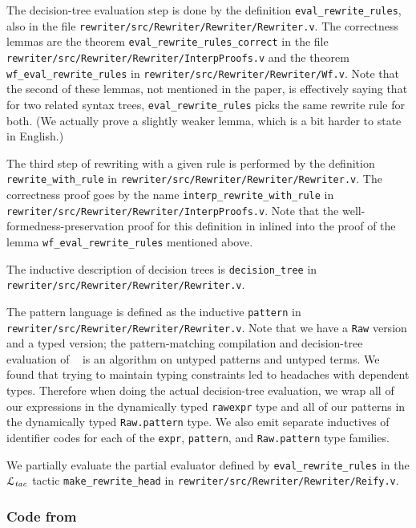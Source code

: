 \documentclass[a4paper,USenglish,cleveref,autoref,thm-restate]{lipics-v2021}
\newcommand{\citet}[1]{\usebibentry{#1}{citet}~\cite{#1}}
\newcommand{\Ltac}{\ensuremath{\mathcal{L}_\text{\emph{tac}}}}
\begin{document}
\begin{minipage}[t][1cm]{\textwidth}
The decision-tree evaluation step is done by the definition \texttt{eval\_rewrite\_rules}, also in the file \texttt{rewriter/src/Rewriter/Rewriter/Rewriter.v}.
The correctness lemmas are the theorem \texttt{eval\_rewrite\_rules\_correct} in the file \texttt{rewriter/src/Rewriter/Rewriter/InterpProofs.v} and the theorem \texttt{wf\_eval\_rewrite\_rules} in \texttt{rewriter/src/Rewriter/Rewriter/Wf.v}.
Note that the second of these lemmas, not mentioned in the paper, is effectively saying that for two related syntax trees, \texttt{eval\_rewrite\_rules} picks the same rewrite rule for both.
(We actually prove a slightly weaker lemma, which is a bit harder to state in English.)

The third step of rewriting with a given rule is performed by the definition \texttt{rewrite\_with\_rule} in \texttt{rewriter/src/Rewriter/Rewriter/Rewriter.v}.
The correctness proof goes by the name \texttt{interp\_rewrite\_with\_rule} in \texttt{rewriter/src/Rewriter/Rewriter/InterpProofs.v}.
Note that the well-formedness-preservation proof for this definition in inlined into the proof of the lemma \verb|wf_eval_rewrite_rules| mentioned above.

The inductive description of decision trees is \verb|decision_tree| in \texttt{rewriter/src/Rewriter/Rewriter/Rewriter.v}.

The pattern language is defined as the inductive \verb|pattern| in \texttt{rewriter/src/Rewriter/Rewriter/Rewriter.v}.
Note that we have a \verb|Raw| version and a typed version; the pattern-matching compilation and decision-tree evaluation of \citet{Aehlig} is an algorithm on untyped patterns and untyped terms.
We found that trying to maintain typing constraints led to headaches with dependent types.
Therefore when doing the actual decision-tree evaluation, we wrap all of our expressions in the dynamically typed \verb|rawexpr| type and all of our patterns in the dynamically typed \verb|Raw.pattern| type.
We also emit separate inductives of identifier codes for each of the \verb|expr|, \verb|pattern|, and \verb|Raw.pattern| type families.

We partially evaluate the partial evaluator defined by \verb|eval_rewrite_rules| in the \Ltac{} tactic \verb|make_rewrite_head| in \texttt{rewriter/src/Rewriter/Rewriter/Reify.v}.

\subsubsection{Code from }


\end{minipage}
\end{document}
